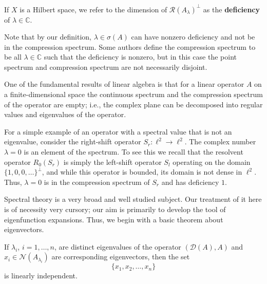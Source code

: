\begin{Definition}
\label{def:spectral-deficiency}
If $X$ is a Hilbert space, we refer to the dimension of $\mathcal{R}(A_\lambda)^\perp$ as the \textbf{deficiency} of $\lambda\in\mathbb{C}$.
\end{Definition}

Note that by our definition, $\lambda\in\sigma(A)$ can have nonzero deficiency and not be in the compression spectrum. Some authors define the compression spectrum to be all $\lambda\in\mathbb{C}$ such that the deficiency is nonzero, but in this case the point spectrum and compression spectrum are not necessarily disjoint.

\begin{Example}
\label{ex:finite-dimensional-spectrum-regular-eigenvalues}
One of the fundamental results of linear algebra is that for a linear operator $A$ on a finite-dimensional space the continuous spectrum and the compression spectrum of the operator are empty; i.e., the complex plane can be decomposed into regular values and eigenvalues of the operator.
\end{Example}

\begin{Example}
\label{ex:right-shift-compression-spectrum}
For a simple example of an operator with a spectral value that is not an eigenvalue, consider the right-shift operator $S_r:\ell^2\to\ell^2$. The complex number $\lambda=0$ is an element of the spectrum. To see this we recall that the resolvent operator $R_0(S_r)$ is simply the left-shift operator $S_l$ operating on the domain $\{1,0,0,\ldots\}^\perp$, and while this operator is bounded, its domain is not dense in $\ell^2$. Thus, $\lambda=0$ is in the compression spectrum of $S_r$ and has deficiency $1$.
\end{Example}

Spectral theory is a very broad and well studied subject. Our treatment of it here is of necessity very cursory; our aim is primarily to develop the tool of eigenfunction expansions. Thus, we begin with a basic theorem about eigenvectors.

\begin{Theorem}
\label{thm:distinct-eigenvalue-eigenvectors-independence}
If $\lambda_i$, $i=1,\ldots,n$, are distinct eigenvalues of the operator $(\mathcal{D}(A),A)$ and $x_i\in\mathcal{N}(A_{\lambda_i})$ are corresponding eigenvectors, then the set\[\{x_1,x_2,\ldots,x_n\}\]is linearly independent.
\end{Theorem}

